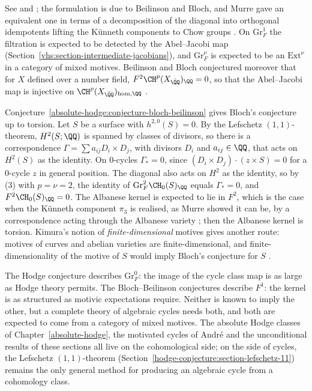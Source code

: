 See \cite{jannsen-1994} and \cite{bloch-lectures}; the formulation is due to Beilinson and Bloch, and Murre gave an equivalent one in terms of a decomposition of the diagonal into orthogonal idempotents
lifting the K\"unneth components to Chow groups \cite{murre-1993}. On $\mathrm{Gr}^1_F$ the filtration is expected to be detected by the Abel--Jacobi map (Section~\ref{vhs:section-intermediate-jacobians}), and
$\mathrm{Gr}^\nu_F$ is expected to be an $\mathrm{Ext}^\nu$ in a category of mixed motives. Beilinson and Bloch conjectured moreover that for $X$ defined over a number field, $F^2\CH^p(X_{\bar{\QQ}})_\QQ = 0$,
so that the Abel--Jacobi map is injective on $\CH^p(X_{\bar{\QQ}})_{\mathrm{hom},\QQ}$ \cite{beilinson-1987}.

\begin{remark}\label{absolute-hodge:remark-bb-bloch}
Conjecture~\ref{absolute-hodge:conjecture-bloch-beilinson} gives Bloch's conjecture up to torsion. Let $S$ be a surface with $h^{2,0}(S) = 0$. By the Lefschetz $(1,1)$-theorem, $H^2(S; \QQ)$ is spanned by
classes of divisors, so there is a correspondence $\Gamma = \sum a_{ij}D_i \times D_j$, with divisors $D_i$ and $a_{ij} \in \QQ$, that acts on $H^2(S)$ as the identity. On $0$-cycles $\Gamma_* = 0$, since
$(D_i \times D_j) \cdot (z \times S) = 0$ for a $0$-cycle $z$ in general position. The diagonal also acts on $H^2$ as the identity, so by (3) with $p = \nu = 2$, the identity of $\mathrm{Gr}^2_F\CH_0(S)_\QQ$ equals $\Gamma_* = 0$, and
$F^2\CH_0(S)_\QQ = 0$. The Albanese kernel is expected to lie in $F^2$, which is the case when the K\"unneth component $\pi_3$ is realised, as Murre showed it can be, by a correspondence acting through the
Albanese variety \cite{murre-1993}; then the Albanese kernel is torsion. Kimura's notion of \emph{finite-dimensional} motives gives another route: motives of curves and abelian varieties are
finite-dimensional, and finite-dimensionality of the motive of $S$ would imply Bloch's conjecture for $S$ \cite{kimura-2005}.
\end{remark}

\begin{remark}\label{absolute-hodge:remark-two-halves}
The Hodge conjecture describes $\mathrm{Gr}^0_F$: the image of the cycle class map is as large as Hodge theory permits. The Bloch--Beilinson conjectures describe $F^1$: the kernel is as structured as
motivic expectations require. Neither is known to imply the other, but a complete theory of algebraic cycles needs both, and both are expected to come from a category of mixed motives. The absolute Hodge
classes of Chapter~\ref{absolute-hodge}, the motivated cycles of Andr\'e and the unconditional results of these sections all live on the cohomological side; on the side of cycles, the Lefschetz $(1,1)$-theorem
(Section~\ref{hodge-conjecture:section-lefschetz-11}) remains the only general method for producing an algebraic cycle from a cohomology class.
\end{remark}


